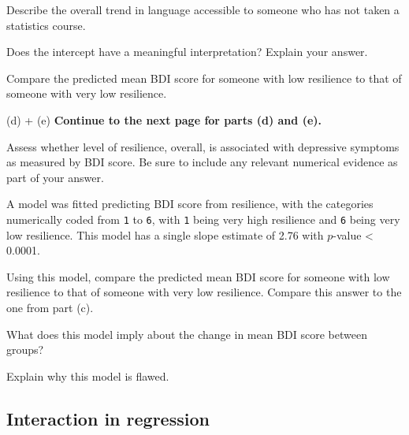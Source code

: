 {\begin{parts}
		\item Describe the overall trend in language accessible to someone who has not taken a statistics course. 
		
		\item Does the intercept have a meaningful interpretation? Explain your answer.
		
		\item Compare the predicted mean BDI score for someone with low resilience to that of someone with very low resilience.

		\item[(d) + (e)] \textbf{Continue to the next page for parts (d) and (e).}
		
\textD{\newpage}

		\item Assess whether level of resilience, overall, is associated with depressive symptoms as measured by BDI score. Be sure to include any relevant numerical evidence as part of your answer.
		
		\item A model was fitted predicting BDI score from resilience, with the categories numerically coded from \texttt{1} to \texttt{6}, with \texttt{1} being very high resilience and \texttt{6} being very low resilience. This model has a single slope estimate of 2.76 with $p$-value < 0.0001. 
		
		\begin{subparts}
			\item Using this model, compare the predicted mean BDI score for someone with low resilience to that of someone with very low resilience. Compare this answer to the one from part (c).
			
			\item What does this model imply about the change in mean BDI score between groups?
			
			\item Explain why this model is flawed.
			
		\end{subparts}
	\end{parts}
}{}

\subsection{Interaction in regression}


